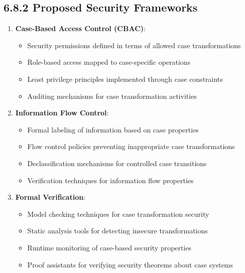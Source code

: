 \documentclass[
  11pt,
  letterpaper,
]{article}
\providecommand{\tightlist}{%
  \setlength{\itemsep}{0pt}\setlength{\parskip}{0pt}}
\begin{document}
\hypertarget{proposed-security-frameworks}{%
\subsection{6.8.2 Proposed Security
Frameworks}\label{proposed-security-frameworks}}

\begin{enumerate}
\def\labelenumi{\arabic{enumi}.}
\tightlist
\item
  \textbf{Case-Based Access Control (CBAC)}:

  \begin{itemize}
  \tightlist
  \item
    Security permissions defined in terms of allowed case
    transformations
  \item
    Role-based access mapped to case-specific operations
  \item
    Least privilege principles implemented through case constraints
  \item
    Auditing mechanisms for case transformation activities
  \end{itemize}
\item
  \textbf{Information Flow Control}:

  \begin{itemize}
  \tightlist
  \item
    Formal labeling of information based on case properties
  \item
    Flow control policies preventing inappropriate case transformations
  \item
    Declassification mechanisms for controlled case transitions
  \item
    Verification techniques for information flow properties
  \end{itemize}
\item
  \textbf{Formal Verification}:

  \begin{itemize}
  \tightlist
  \item
    Model checking techniques for case transformation security
  \item
    Static analysis tools for detecting insecure transformations
  \item
    Runtime monitoring of case-based security properties
  \item
    Proof assistants for verifying security theorems about case systems
  \end{itemize}
\end{enumerate}
\end{document}
